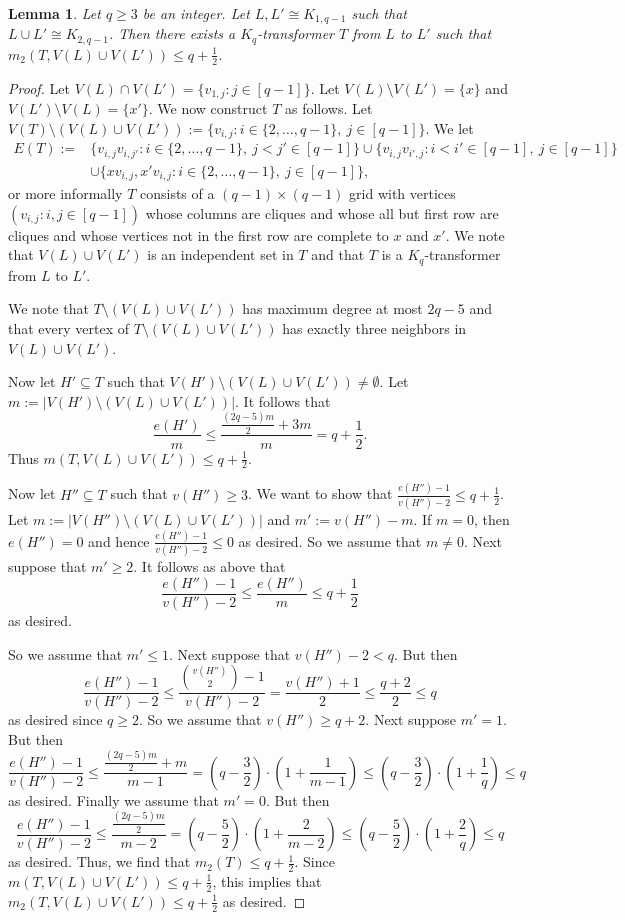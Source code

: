 \documentclass[11pt]{article}
\numberwithin{equation}{section}
\newcounter{i}
\theoremstyle{plain}
\newtheorem{lem}[thm]{Lemma}
\theoremstyle{plain} %
\theoremstyle{definition}
\begin{document}
\begin{lem}\label{lem:StarTransformerGeneral}
Let $q\ge 3$ be an integer. Let $L,L' \cong K_{1,q-1}$ such that $L\cup L' \cong K_{2,q-1}$. Then there exists a $K_q$-transformer $T$ from $L$ to $L'$ such that $m_2(T,V(L)\cup V(L')) \le q +\frac{1}{2}$.
\end{lem}
\begin{proof}
Let $V(L)\cap V(L') = \{v_{1,j}:j\in [q-1]\}$. Let $V(L)\setminus V(L') = \{x\}$ and $V(L')\setminus V(L) = \{x'\}$. We now construct $T$ as follows. Let $V(T)\setminus (V(L)\cup V(L')) := \{v_{i,j} : i\in \{2,\ldots, q-1\},~j\in[q-1] \}$. We let
\begin{align*}E(T) := &\{ v_{i,j}v_{i,j'} : i\in \{2,\ldots,q-1\},~j<j'\in [q-1]\} \cup \{ v_{i,j}v_{i',j} : i < i'\in [q-1],~j\in [q-1]\}\\
&\cup \{ xv_{i,j}, x'v_{i,j}: i\in \{2,\ldots,q-1\},~j\in [q-1] \},
\end{align*}
or more informally $T$ consists of a $(q-1)\times (q-1)$ grid with vertices $(v_{i,j}:i,j\in [q-1])$ whose columns are cliques and whose all but first row are cliques and whose vertices not in the first row are complete to $x$ and $x'$. We note that $V(L)\cup V(L')$ is an independent set in $T$ and that $T$ is a $K_q$-transformer from $L$ to $L'$. 

We note that $T\setminus (V(L)\cup V(L'))$ has maximum degree at most $2q-5$ and that every vertex of $T\setminus (V(L)\cup V(L'))$ has exactly three neighbors in $V(L)\cup V(L')$. 

Now let $H'\subseteq T$ such that $V(H')\setminus (V(L)\cup V(L'))\ne \emptyset$. Let $m:= |V(H')\setminus (V(L)\cup V(L'))|$. It follows that
$$\frac{e(H')}{m} \le \frac{\frac{(2q-5)m}{2} + 3m}{m} = q+\frac{1}{2}.$$
Thus $m(T,V(L)\cup V(L')) \le q +\frac{1}{2}$.

Now let $H''\subseteq T$ such that $v(H'')\ge 3$. We want to show that $\frac{e(H'')-1}{v(H'')-2}\le q + \frac{1}{2}$. Let $m:= |V(H'')\setminus (V(L)\cup V(L'))|$ and $m':= v(H'')-m$. If $m=0$, then $e(H'')=0$ and hence $\frac{e(H'')-1}{v(H'')-2} \le 0$ as desired. So we assume that $m\ne 0$. Next suppose that $m' \ge 2$. It follows as above that
$$\frac{e(H'')-1}{v(H'')-2} \le \frac{e(H'')}{m} \le q+\frac{1}{2}$$
as desired. 

So we assume that $m'\le 1$. Next suppose that $v(H'') - 2 < q$. But then
$$\frac{e(H'')-1}{v(H'')-2} \le \frac{\binom{v(H'')}{2}-1}{v(H'')-2} = \frac{v(H'')+1}{2} \le \frac{q+2}{2} \le q$$
as desired since $q\ge 2$. So we assume that $v(H'')\ge q+2$. Next suppose $m'= 1$. But then
$$\frac{e(H'')-1}{v(H'')-2} \le \frac{\frac{(2q-5)m}{2}+m}{m-1} = \left(q-\frac{3}{2}\right)\cdot \left(1+\frac{1}{m-1}\right) \le \left(q-\frac{3}{2}\right)\cdot \left(1+\frac{1}{q}\right) \le q$$
as desired. Finally we assume that $m'= 0$. But then
$$\frac{e(H'')-1}{v(H'')-2} \le \frac{\frac{(2q-5)m}{2}}{m-2} = \left(q-\frac{5}{2}\right)\cdot \left(1+\frac{2}{m-2}\right) \le \left(q-\frac{5}{2}\right)\cdot \left(1+\frac{2}{q}\right) \le q$$
as desired. Thus, we find that $m_2(T)\le q+\frac{1}{2}$. Since $m(T,V(L)\cup V(L'))\le q+\frac{1}{2}$, this implies that $m_2(T,V(L)\cup V(L'))\le q+\frac{1}{2}$ as desired.
\end{proof}
\end{document}
